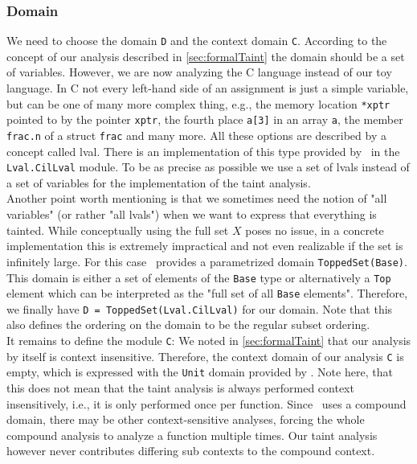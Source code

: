       \subsubsection{Domain}
        We need to choose the domain \texttt{D} and the context domain \texttt{C}. According to the concept of our analysis described in \autoref{sec:formalTaint} the domain should be a set of variables. However, we are now analyzing the C language instead of our toy language. In C not every left-hand side of an assignment is just a simple variable, but can be one of many more complex thing, e.g., the memory location \texttt{*xptr} pointed to by the pointer \texttt{xptr}, the fourth place \texttt{a[3]} in an array \texttt{a}, the member \texttt{frac.n} of a struct \texttt{frac} and many more. All these options are described by a concept called \ac{lval}. There is an implementation of this type provided by \gob\ in the \texttt{Lval.CilLval} module. To be as precise as possible we use a set of \ac{lval}s instead of a set of variables for the implementation of the taint analysis.\\
        Another point worth mentioning is that we sometimes need the notion of "all variables" (or rather "all \ac{lval}s") when we want to express that everything is tainted. While conceptually using the full set $X$ poses no issue, in a concrete implementation this is extremely impractical and not even realizable if the set is infinitely large. For this case \gob\ provides a parametrized domain \texttt{ToppedSet(Base)}. This domain is either a set of elements of the \texttt{Base} type or alternatively a \texttt{Top} element which can be interpreted as the "full set of all \texttt{Base} elements". Therefore, we finally have \texttt{D = ToppedSet(Lval.CilLval)} for our domain. Note that this also defines the ordering on the domain to be the regular subset ordering.\\
        It remains to define the module \texttt{C}: We noted in \autoref{sec:formalTaint} that our analysis by itself is context insensitive. Therefore, the context domain of our analysis \texttt{C} is empty, which is expressed with the \texttt{Unit} domain provided by \gob. Note here, that this does not mean that the taint analysis is always performed context insensitively, i.e., it is only performed once per function. Since \gob\ uses a compound domain, there may be other context-sensitive analyses, forcing the whole compound analysis to analyze a function multiple times. Our taint analysis however never contributes differing sub contexts to the compound context.

